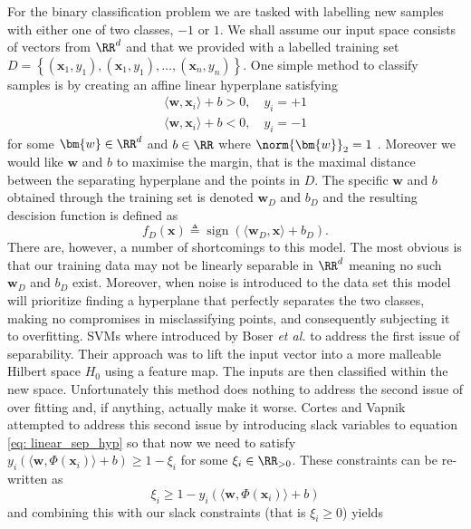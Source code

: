 For the binary classification problem we are tasked with labelling new samples with either one of two classes, $-1$ or $1$. We shall assume our input space consists of vectors from $\RR^d$ and that we provided with a labelled training set $D = \left\{ \left( \bm{x}_1 , y_1 \right), \left( \bm{x}_1 , y_1 \right), \ldots , \left( \bm{x}_n , y_n \right) \right\}$. One simple method to classify samples is by creating an affine linear hyperplane satisfying
\begin{align} \label{eq: linear_sep_hyp}
    \langle \bm{w}, \bm{x}_i \rangle + b > 0, \quad y_i = +1 \nonumber \\
    \langle \bm{w}, \bm{x}_i \rangle + b < 0, \quad y_i = -1
\end{align}
for some $\bm{w} \in \RR^d$ and $b \in \RR$ where $\norm{\bm{w}}_2 = 1$ \cite{SteinwartIngo2008SVMb}. Moreover we would like $\bm{w}$ and $b$ to maximise the margin, that is the maximal distance between the separating hyperplane and the points in $D$. The specific $\bm{w}$ and $b$ obtained through the training set is denoted $\bm{w}_D$ and $b_D$ and the resulting descision function is defined as
\[
    f_D \left( \bm{x} \right) \triangleq \operatorname{sign} \left( \langle \bm{w}_D , \bm{x} \rangle + b_D \right).
\]
There are, however, a number of shortcomings to this model. The most obvious is that our training data may not be linearly separable in $\RR^d$ meaning no such $\bm{w}_D$ and $b_D$ exist. Moreover, when noise is introduced to the data set this model will prioritize finding a hyperplane that perfectly separates the two classes, making no compromises in misclassifying points, and consequently subjecting it to overfitting. SVMs where introduced by Boser {\it et al.} \cite{BoserBernhard1992Ataf} to address the first issue of separability. Their approach was to lift the input vector into a more malleable Hilbert space $H_0$ using a feature map. The inputs are then classified within the new space. Unfortunately this method does nothing to address the second issue of over fitting and, if anything, actually make it worse. Cortes and Vapnik \cite{CortesCorinna1995SN} attempted to address this second issue by introducing slack variables to equation \ref{eq: linear_sep_hyp} so that now we need to satisfy $y_i \left( \langle \bm{w} , \Phi \left( \bm{x}_i \right) \rangle + b \right) \geq 1 - \xi_i$ for some $\xi_i \in \RR_{>0}$. These constraints can be re-written as
\[
    \xi_i \geq 1 - y_i \left( \langle \bm{w} , \Phi \left( \bm{x}_i \right) \rangle + b \right)
\]
and combining this with our slack constraints (that is $\xi_i \geq 0$) yields
